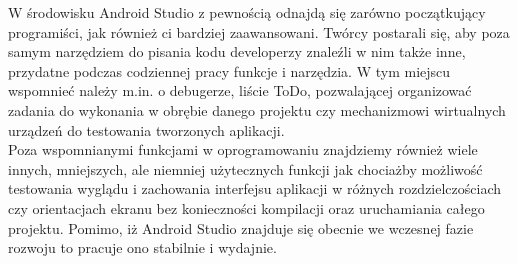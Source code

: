 W środowisku Android Studio z pewnością odnajdą się zarówno początkujący programiści, jak również ci bardziej zaawansowani. Twórcy postarali się, aby poza samym narzędziem do pisania kodu developerzy znaleźli w nim także inne, przydatne podczas codziennej pracy funkcje i narzędzia. W tym miejscu wspomnieć należy m.in. o debugerze, liście ToDo, pozwalającej organizować zadania do wykonania w obrębie danego projektu czy mechanizmowi wirtualnych urządzeń do testowania tworzonych aplikacji.\\

Poza wspomnianymi funkcjami w oprogramowaniu znajdziemy również wiele innych, mniejszych, ale niemniej użytecznych funkcji jak chociażby możliwość testowania wyglądu i zachowania interfejsu aplikacji w różnych rozdzielczościach czy orientacjach ekranu bez konieczności kompilacji oraz uruchamiania całego projektu. Pomimo, iż Android Studio znajduje się obecnie we wczesnej fazie rozwoju to pracuje ono stabilnie i wydajnie.





